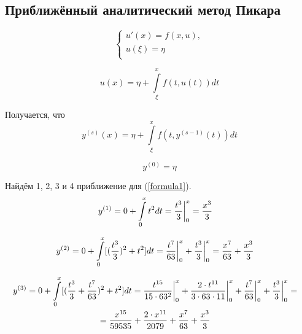 \subsection*{Приближённый аналитический метод Пикара}
\begin{equation}\label{formula4}
	\left\{
	\begin{array}{ccc}
		u'(x) = f(x, u),\\
		u(\xi) = \eta\\
	\end{array}
	\right.
\end{equation}

\begin{equation}\label{formula5}
	u(x) = \eta + \int\limits_\xi^x f(t, u(t))dt
\end{equation}

Получается, что
\begin{equation}\label{formula6}
	y^{(s)}(x) = \eta + \int\limits_\xi^x f(t, y^{(s - 1)}(t))dt
\end{equation}

\begin{equation}\label{formula7}
	y^{(0)} = \eta
\end{equation}

Найдём 1, 2, 3 и 4 приближение для (\ref{formula1}).\\
\begin{multline}\label{formula8}
	\shoveright
	{
		y^{(1)} = 0 + \int\limits_0^x t^2dt = \frac{t^3}{3}\bigg|_0^x = \frac{x^3}{3}
	}
\end{multline}


\begin{multline}\label{formula9}
	\shoveright
	{
		y^{(2)} = 0 + \int\limits_0^x [(\frac{t^3}{3})^2 + t^2]dt = \frac{t^7}{63}\bigg|_0^x + \frac{t^3}{3}\bigg|_0^x = \frac{x^7}{63} + \frac{x^3}{3}
	}
\end{multline}

\begin{multline}\label{formula10}
	\shoveright
	{
	\begin{gathered}
		y^{(3)} = 0 + \int\limits_0^x [(\frac{t^3}{3} + \frac{t^7}{63})^2 + t^2]dt = \frac{t^{15}}{15\cdot63^2}\bigg|_0^x + \frac{2\cdot t^{11}}{3\cdot63\cdot11}\bigg|_0^x + \frac{t^7}{63}\bigg|_0^x + \frac{t^3}{3}\bigg|_0^x = \\
		= \frac{x^{15}}{59535} + \frac{2\cdot x^{11}}{2079} + \frac{x^7}{63} + \frac{x^3}{3}
	\end{gathered}
	}
\end{multline}

